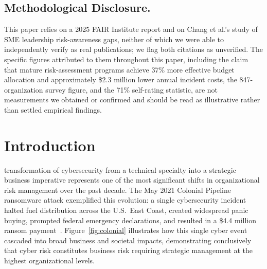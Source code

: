 \documentclass[journal]{IEEEtran}
\begin{document}
\subsection*{Methodological Disclosure.}
This paper relies on a 2025 FAIR Institute report and on Chang et al.'s
study of SME leadership risk-awareness gaps, neither of which we were able
to independently verify as real publications; we flag both citations as
unverified. The specific figures attributed to them throughout this
paper, including the claim that mature risk-assessment programs achieve
37\% more effective budget allocation and approximately \$2.3 million
lower annual incident costs, the 847-organization survey figure, and the
71\% self-rating statistic, are not measurements we obtained or confirmed
and should be read as illustrative rather than settled empirical findings.

\section{Introduction}
 transformation of cybersecurity from a technical specialty into a
strategic business imperative represents one of the most significant shifts in
organizational risk management over the past decade. The May 2021 Colonial Pipeline
ransomware attack exemplified this evolution: a single cybersecurity incident halted
fuel distribution across the U.S.\ East Coast, created widespread panic buying, prompted
federal emergency declarations, and resulted in a \$4.4 million ransom
payment~\cite{cisa2021colonial}. Figure~\ref{fig:colonial} illustrates how this single
cyber event cascaded into broad business and societal impacts, demonstrating conclusively
that cyber risk constitutes business risk requiring strategic management at the highest
organizational levels.
\end{document}
